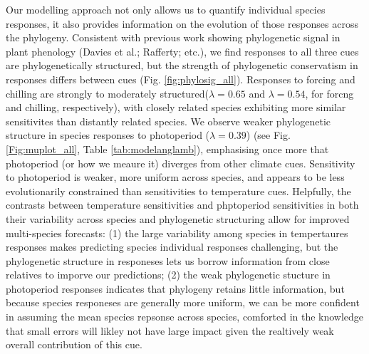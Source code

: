 \documentclass{article}\usepackage[]{graphicx}\usepackage[]{color}
\begin{document}
Our modelling approach not only allows us to quantify individual species responses, it also provides information on the evolution of those responses across the phylogeny. Consistent with previous work showing phylogenetic signal in plant phenology (Davies et al.; Rafferty; etc.), we find responses to all three cues are phylogenetically structured, but the strength of phylogenetic conservatism in responses differs between cues (Fig. \ref{fig:phylosig_all}). Responses to forcing and chilling are strongly to moderately structured($\lambda = 0.65$ and $\lambda = 0.54$, for forcng and chilling, respectively), with closely related species exhibiting more similar sensitivites than distantly related species. We observe weaker phylogenetic structure in species responses to photoperiod ($\lambda= 0.39$) (see Fig. \ref{Fig:muplot_all}, Table \ref{tab:modelanglamb}), emphasising once more that photoperiod (or how we meaure it) diverges from other climate cues. Sensitivity to photoperiod is weaker, more uniform across species, and appears to be less evolutionarily constrained than sensitivities to temperature cues. Helpfully, the contrasts between temperature sensitivities and phptoperiod sensitivities in both their variability across species and phylogenetic structuring allow for improved multi-species forecasts: (1) the large variability among species in tempertaures responses makes predicting species individual responses challenging, but the phylogenetic structure in responeses lets us borrow  information from close relatives to imporve our predictions; (2) the weak phylogenetic stucture in photoperiod responses indicates that phylogeny retains little information, but because species responeses are generally more uniform, we can be more confident in assuming the mean species repsonse across species, comforted in the knowledge that small errors will likley not have large impact given the realtively weak overall contribution of this cue. 
\\
\end{document}
